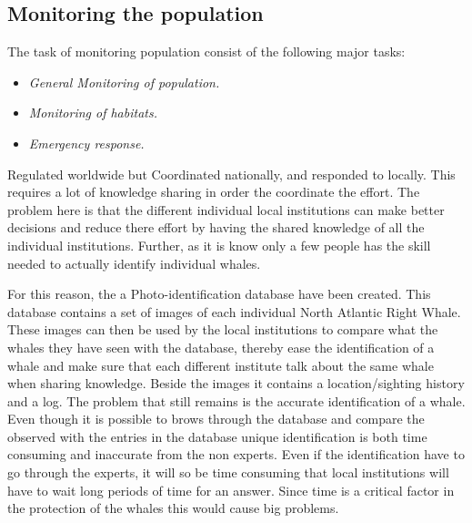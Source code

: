 \subsection{Monitoring the population}
The task of monitoring population consist of the following major tasks:
\begin{itemize}
\item \textit{General Monitoring of population.}
\item \textit{Monitoring of habitats.}
\item \textit{Emergency response.}
\end{itemize}

Regulated worldwide but Coordinated nationally, and responded to locally. This requires a lot of knowledge sharing in order the coordinate the effort. The problem here is that the different individual local institutions can make better decisions and reduce there effort by having the shared knowledge of all the individual institutions.
Further, as it is know only a few people has the skill needed to actually identify individual whales.

For this reason, the a Photo-identification database have been created. This database contains a set of images of each individual North Atlantic Right Whale. 
These images can then be used by the local institutions to compare what the whales they have seen with the database, thereby ease the identification of a whale and make sure that each different institute talk about the same whale when sharing knowledge. Beside the images it contains a location/sighting history and a log.
The problem that still remains is the accurate identification of a whale. Even though it is possible to brows through the database and compare the observed with the entries in the database unique identification is both time consuming and inaccurate from the non experts.
Even if the identification have to go through the experts, it will so be time consuming that local institutions will have to wait long periods of time for an answer.
Since time is a critical factor in the protection of the whales this would cause big problems.
